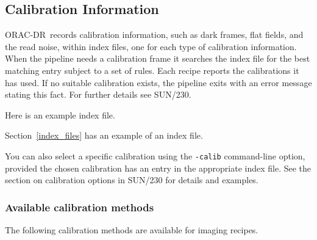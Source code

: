 \documentclass[twoside,11pt]{article}
\newcommand{\htmlref}[2]{#1}
\newenvironment{latexonly}{}{}
\newcommand{\xref}[3]{#1}
\newcommand{\xlabel}[1]{}
\renewcommand{\_}{\texttt{\symbol{95}}}
\newcommand{\ORACDR}{{\footnotesize ORAC-DR}}
\begin{document}
\subsection{\xlabel{calibration_information}Calibration Information\label{calibration_information}}

\ORACDR\ records calibration information, such as dark frames, flat
fields, and the read noise, within index files, one for each type of
calibration information.  When the pipeline needs a calibration frame
it searches the index file for the best matching entry subject to a
set of rules. Each recipe reports the calibrations it has used.  If no
suitable calibration exists, the pipeline exits with an error message
stating this fact.  For further details see
\xref{SUN/230}{sun230}{calibration_selection}.
\begin{htmlonly}
Here is an 
\htmlref{example index file.}{index_files}
\end{htmlonly}
\begin{latexonly}
Section~\ref{index_files} has an example of an index file.
\end{latexonly}

You can also select a specific calibration using the {\tt -calib}
command-line option, provided the chosen calibration has an entry
in the appropriate index file.  See
\begin{latexonly}
the section on
\end{latexonly}
\xref{calibration options}{sun230}{calibration_options}
\begin{latexonly}
in SUN/230
\end{latexonly}
for details and examples.

\subsubsection{\xlabel{available_calib}Available calibration methods\label{available_calib}}

The following calibration methods are available for imaging recipes.
\end{document}

